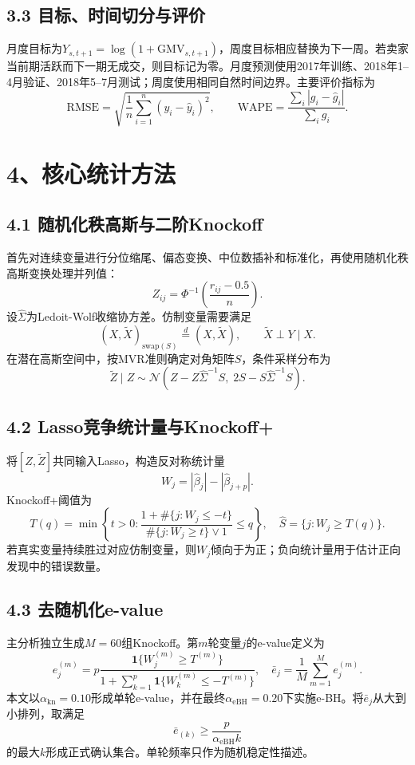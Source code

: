 \documentclass[UTF8,12pt,a4paper]{ctexart}
\begin{document}
\subsection*{3.3 目标、时间切分与评价}

月度目标为$Y_{s,t+1}=\log(1+\mathrm{GMV}_{s,t+1})$，周度目标相应替换为下一周。若卖家当前期活跃而下一期无成交，则目标记为零。月度预测使用2017年训练、2018年1--4月验证、2018年5--7月测试；周度使用相同自然时间边界。主要评价指标为
\[
\mathrm{RMSE}=\sqrt{\frac{1}{n}\sum_{i=1}^n(y_i-\widehat y_i)^2},
\qquad
\mathrm{WAPE}=\frac{\sum_i|g_i-\widehat g_i|}{\sum_i g_i}.
\]

\newpage
\section*{4、核心统计方法}

\subsection*{4.1 随机化秩高斯与二阶Knockoff}

首先对连续变量进行分位缩尾、偏态变换、中位数插补和标准化，再使用随机化秩高斯变换处理并列值：
\[
Z_{ij}=\Phi^{-1}\left(\frac{r_{ij}-0.5}{n}\right).
\]
设$\widehat\Sigma$为Ledoit-Wolf收缩协方差。仿制变量需要满足
\[
(X,\widetilde X)_{\mathrm{swap}(S)}\overset d=(X,\widetilde X),
\qquad \widetilde X\perp Y\mid X.
\]
在潜在高斯空间中，按MVR准则确定对角矩阵$S$，条件采样分布为
\[
\widetilde Z\mid Z\sim
\mathcal N\left(Z-Z\widehat\Sigma^{-1}S,\;
2S-S\widehat\Sigma^{-1}S\right).
\]

\subsection*{4.2 Lasso竞争统计量与Knockoff+}

将$[Z,\widetilde Z]$共同输入Lasso，构造反对称统计量
\[
W_j=|\widehat\beta_j|-|\widehat\beta_{j+p}|.
\]
Knockoff+阈值为
\[
T(q)=\min\left\{t>0:
\frac{1+\#\{j:W_j\le -t\}}{\#\{j:W_j\ge t\}\vee1}\le q
\right\},
\quad \widehat S=\{j:W_j\ge T(q)\}.
\]
若真实变量持续胜过对应仿制变量，则$W_j$倾向于为正；负向统计量用于估计正向发现中的错误数量。

\subsection*{4.3 去随机化e-value}

主分析独立生成$M=60$组Knockoff。第$m$轮变量$j$的e-value定义为
\[
e_j^{(m)}
=p\frac{\mathbf1\{W_j^{(m)}\ge T^{(m)}\}}
{1+\sum_{k=1}^p\mathbf1\{W_k^{(m)}\le -T^{(m)}\}},
\quad
\bar e_j=\frac1M\sum_{m=1}^M e_j^{(m)}.
\]
本文以$\alpha_{\mathrm{kn}}=0.10$形成单轮e-value，并在最终$\alpha_{\mathrm{eBH}}=0.20$下实施e-BH。将$\bar e_j$从大到小排列，取满足
\[
\bar e_{(k)}\ge \frac{p}{\alpha_{\mathrm{eBH}}k}
\]
的最大$k$形成正式确认集合。单轮频率只作为随机稳定性描述。
\end{document}
